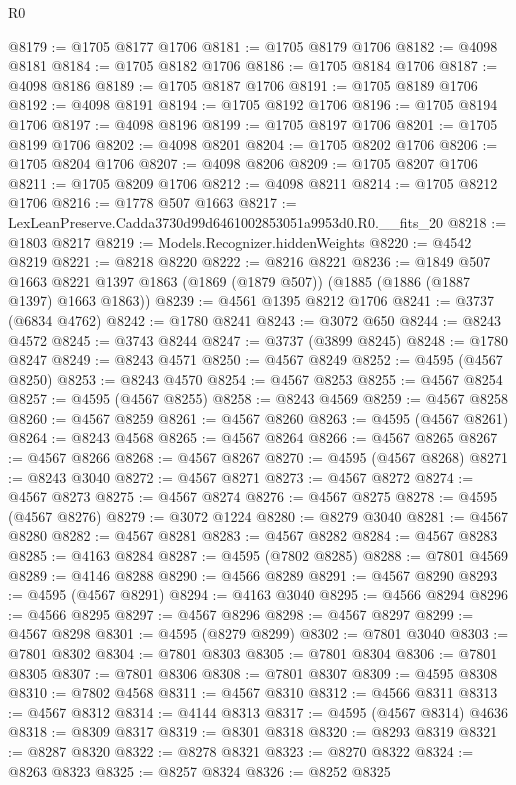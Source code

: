\begin{lexlean}{R0}
\begin{coremodule}
@8179 := @1705 @8177 @1706
@8181 := @1705 @8179 @1706
@8182 := @4098 @8181
@8184 := @1705 @8182 @1706
@8186 := @1705 @8184 @1706
@8187 := @4098 @8186
@8189 := @1705 @8187 @1706
@8191 := @1705 @8189 @1706
@8192 := @4098 @8191
@8194 := @1705 @8192 @1706
@8196 := @1705 @8194 @1706
@8197 := @4098 @8196
@8199 := @1705 @8197 @1706
@8201 := @1705 @8199 @1706
@8202 := @4098 @8201
@8204 := @1705 @8202 @1706
@8206 := @1705 @8204 @1706
@8207 := @4098 @8206
@8209 := @1705 @8207 @1706
@8211 := @1705 @8209 @1706
@8212 := @4098 @8211
@8214 := @1705 @8212 @1706
@8216 := @1778 @507 @1663
@8217 := LexLeanPreserve.Cadda3730d99d6461002853051a9953d0.R0.__fits_20
@8218 := @1803 @8217
@8219 := Models.Recognizer.hiddenWeights
@8220 := @4542 @8219
@8221 := @8218 @8220
@8222 := @8216 @8221
@8236 := @1849
    @507
    @1663
    @8221
    @1397
    @1863
    (@1869 (@1879 @507))
    (@1885 (@1886 (@1887 @1397) @1663 @1863))
@8239 := @4561 @1395 @8212 @1706
@8241 := @3737 (@6834 @4762)
@8242 := @1780 @8241
@8243 := @3072 @650
@8244 := @8243 @4572
@8245 := @3743 @8244
@8247 := @3737 (@3899 @8245)
@8248 := @1780 @8247
@8249 := @8243 @4571
@8250 := @4567 @8249
@8252 := @4595 (@4567 @8250)
@8253 := @8243 @4570
@8254 := @4567 @8253
@8255 := @4567 @8254
@8257 := @4595 (@4567 @8255)
@8258 := @8243 @4569
@8259 := @4567 @8258
@8260 := @4567 @8259
@8261 := @4567 @8260
@8263 := @4595 (@4567 @8261)
@8264 := @8243 @4568
@8265 := @4567 @8264
@8266 := @4567 @8265
@8267 := @4567 @8266
@8268 := @4567 @8267
@8270 := @4595 (@4567 @8268)
@8271 := @8243 @3040
@8272 := @4567 @8271
@8273 := @4567 @8272
@8274 := @4567 @8273
@8275 := @4567 @8274
@8276 := @4567 @8275
@8278 := @4595 (@4567 @8276)
@8279 := @3072 @1224
@8280 := @8279 @3040
@8281 := @4567 @8280
@8282 := @4567 @8281
@8283 := @4567 @8282
@8284 := @4567 @8283
@8285 := @4163 @8284
@8287 := @4595 (@7802 @8285)
@8288 := @7801 @4569
@8289 := @4146 @8288
@8290 := @4566 @8289
@8291 := @4567 @8290
@8293 := @4595 (@4567 @8291)
@8294 := @4163 @3040
@8295 := @4566 @8294
@8296 := @4566 @8295
@8297 := @4567 @8296
@8298 := @4567 @8297
@8299 := @4567 @8298
@8301 := @4595 (@8279 @8299)
@8302 := @7801 @3040
@8303 := @7801 @8302
@8304 := @7801 @8303
@8305 := @7801 @8304
@8306 := @7801 @8305
@8307 := @7801 @8306
@8308 := @7801 @8307
@8309 := @4595 @8308
@8310 := @7802 @4568
@8311 := @4567 @8310
@8312 := @4566 @8311
@8313 := @4567 @8312
@8314 := @4144 @8313
@8317 := @4595 (@4567 @8314) @4636
@8318 := @8309 @8317
@8319 := @8301 @8318
@8320 := @8293 @8319
@8321 := @8287 @8320
@8322 := @8278 @8321
@8323 := @8270 @8322
@8324 := @8263 @8323
@8325 := @8257 @8324
@8326 := @8252 @8325

\end{coremodule}
\end{lexlean}
